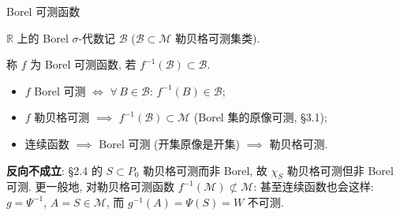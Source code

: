 \begin{frame}{Borel 可测函数}

$\mathbb{R}$ 上的 Borel $\sigma$-代数记 $\mathscr{B}$ ($\mathscr{B} \subset \mathscr{M}$
勒贝格可测集类).

\begin{Def}
称 $f$ 为 \alert{Borel 可测函数}, 若 $f^{-1}(\mathscr{B}) \subset \mathscr{B}$.
\end{Def}

\pause

\begin{itemize}
\item $f$ Borel 可测 $\iff$ $\forall\, B \in \mathscr{B}$: $f^{-1}(B) \in \mathscr{B}$;
\item $f$ 勒贝格可测 $\implies$ $f^{-1}(\mathscr{B}) \subset \mathscr{M}$
  (Borel 集的原像可测, \S 3.1);
\item 连续函数 $\implies$ Borel 可测 (开集原像是开集) $\implies$ 勒贝格可测.
\end{itemize}

\pause

\begin{attnblock}
\textbf{反向不成立}: \S 2.4 的 $S \subset P_0$ 勒贝格可测而非 Borel,
故 $\chi_S$ 勒贝格可测但\alert{非 Borel 可测}. 更一般地, 对勒贝格可测函数
$f^{-1}(\mathscr{M}) \not\subset \mathscr{M}$: 甚至\alert{连续}函数也会这样:
$g = \Psi^{-1}$, $A = S \in \mathscr{M}$, 而 $g^{-1}(A) = \Psi(S) = W$ 不可测.
\end{attnblock}

\end{frame}


